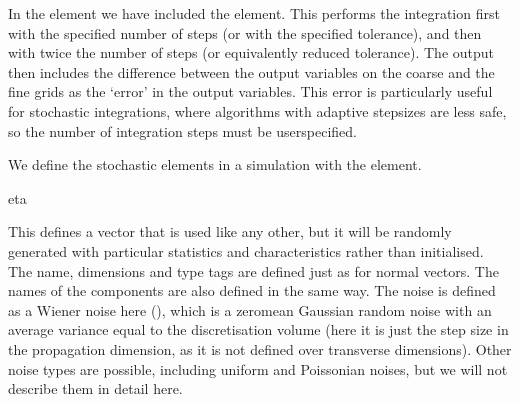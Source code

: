\documentclass[letterpaper,10pt,english]{sphinxmanual}
\begin{document}
\sphinxAtStartPar
In the  element we have included the  element.  This performs the integration first with the specified number of steps (or with the specified tolerance), and then with twice the number of steps (or equivalently reduced tolerance).  The output then includes the difference between the output variables on the coarse and the fine grids as the ‘error’ in the output variables.  This error is particularly useful for stochastic integrations, where algorithms with adaptive step\sphinxhyphen{}sizes are less safe, so the number of integration steps must be user\sphinxhyphen{}specified.

\ignorespaces 
\sphinxAtStartPar
We define the stochastic elements in a simulation with the  element.

\begin{sphinxVerbatim}[commandchars=\\\{\}]
      
 eta
\end{sphinxVerbatim}

\sphinxAtStartPar
This defines a vector that is used like any other, but it will be randomly generated with particular statistics and characteristics rather than initialised.  The name, dimensions and type tags are defined just as for normal vectors.  The names of the components are also defined in the same way.  The noise is defined as a Wiener noise here (), which is a zero\sphinxhyphen{}mean Gaussian random noise with an average variance equal to the discretisation volume (here it is just the step size in the propagation dimension, as it is not defined over transverse dimensions).  Other noise types are possible, including uniform and Poissonian noises, but we will not describe them in detail here.
\end{document}
